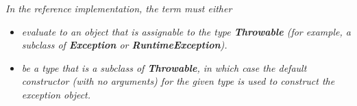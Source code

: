 \emph{In the reference implementation, the \emph{term} must
either}
\begin{itemize}
\item 
\emph{evaluate to an object that is assignable to the
type \textbf{Throwable} (for example, a subclass
of \textbf{Exception} or \textbf{RuntimeException}).}
\item 
\emph{be a type that is a subclass of \textbf{Throwable}, in which case
the default constructor (with no arguments) for the given type is used
to construct the exception object.}
\end{itemize}
